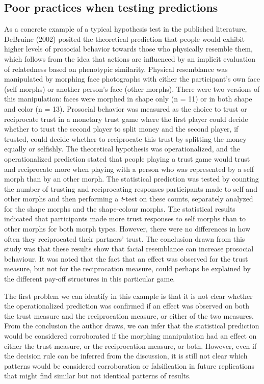 \documentclass[english,doc,floatsintext]{apa6}
\begin{document}
\hypertarget{poor-practices-when-testing-predictions}{%
\subsection{Poor practices when testing predictions}\label{poor-practices-when-testing-predictions}}

As a concrete example of a typical hypothesis test in the published literature, DeBruine (2002) posited the theoretical prediction that people would exhibit higher levels of prosocial behavior towards those who physically resemble them, which follows from the idea that actions are influenced by an implicit evaluation of relatedness based on phenotypic similarity. Physical resemblance was manipulated by morphing face photographs with either the participant's own face (self morphs) or another person's face (other morphs). There were two versions of this manipulation: faces were morphed in shape only (n = 11) or in both shape and color (n = 13). Prosocial behavior was measured as the choice to trust or reciprocate trust in a monetary trust game where the first player could decide whether to trust the second player to split money and the second player, if trusted, could decide whether to reciprocate this trust by splitting the money equally or selfishly. The theoretical hypothesis was operationalized, and the operationalized prediction stated that people playing a trust game would trust and reciprocate more when playing with a person who was represented by a self morph than by an other morph. The statistical prediction was tested by counting the number of trusting and reciprocating responses participants made to self and other morphs and then performing a \emph{t}-test on these counts, separately analyzed for the shape morphs and the shape-colour morphs. The statistical results indicated that participants made more trust responses to self morphs than to other morphs for both morph types. However, there were no differences in how often they reciprocated their partners' trust. The conclusion drawn from this study was that these results show that facial resemblance can increase prosocial behaviour. It was noted that the fact that an effect was observed for the trust measure, but not for the reciprocation measure, could perhaps be explained by the different pay-off structures in this particular game.

The first problem we can identify in this example is that it is not clear whether the operationalized prediction was confirmed if an effect was observed on both the trust measure and the reciprocation measure, or either of the two measures. From the conclusion the author draws, we can infer that the statistical prediction would be considered corroborated if the morphing manipulation had an effect on either the trust measure, or the reciprocation measure, or both. However, even if the decision rule can be inferred from the discussion, it is still not clear which patterns would be considered corroboration or falsification in future replications that might find similar but not identical patterns of results.
\end{document}
